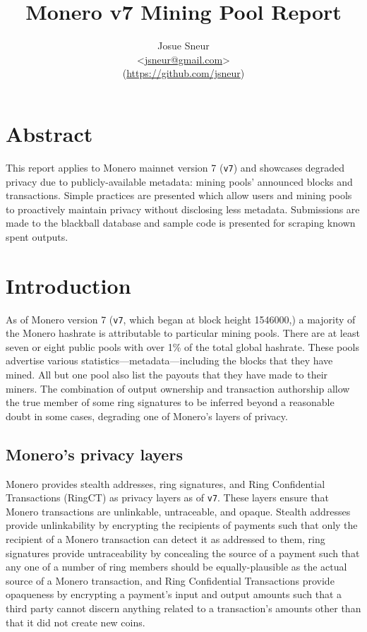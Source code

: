\documentclass[notitlepage]{report}
\title{Monero v7 Mining Pool Report}
\author{Josue Sneur \\
\textless\url{jsneur@gmail.com}\textgreater \\
(\url{https://github.com/jsneur})}
\begin{document}
\maketitle
\thispagestyle{empty}

\section*{Abstract}

This report applies to Monero mainnet version 7 (\verb/v7/) and showcases degraded privacy due to publicly-available metadata: mining pools' announced blocks and transactions.  Simple practices are presented which allow users and mining pools to proactively maintain privacy without disclosing less metadata.  Submissions are made to the blackball database and sample code is presented for scraping known spent outputs.


\tableofcontents

\clearpage

\section{Introduction}
\setcounter{chapter}{1}


As of Monero version 7 (\verb/v7/, which began at block height 1546000,) a majority of the Monero hashrate is attributable to particular mining pools.  There are at least seven or eight public pools with over 1\% of the total global hashrate.  These pools advertise various statistics---metadata---including the blocks that they have mined.  All but one pool also list the payouts that they have made to their miners.  The combination of output ownership and transaction authorship allow the true member of some ring signatures to be inferred beyond a reasonable doubt in some cases, degrading one of Monero's layers of privacy.

\subsection{Monero's privacy layers}

Monero provides stealth addresses, ring signatures, and Ring Confidential Transactions (RingCT) as privacy layers as of \verb/v7/.  These layers ensure that Monero transactions are unlinkable, untraceable, and opaque.  Stealth addresses provide unlinkability by encrypting the recipients of payments such that only the recipient of a Monero transaction can detect it as addressed to them, ring signatures provide untraceability by concealing the source of a payment such that any one of a number of ring members should be equally-plausible as the actual source of a Monero transaction, and Ring Confidential Transactions provide opaqueness by encrypting a payment's input and output amounts such that a third party cannot discern anything related to a transaction's amounts other than that it did not create new coins.
\end{document}
